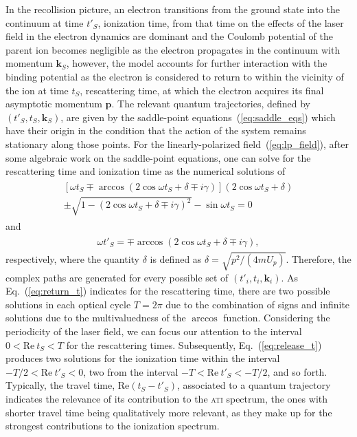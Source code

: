 In the recollision picture, an electron transitions from the ground
state into the continuum at time $t'_{S}$, ionization time, from that
time on the effects of the laser field in the electron dynamics are
dominant and the Coulomb potential of the parent ion becomes
negligible as the electron propagates in the continuum with momentum
$\mathbf{k}_{S}$, however, the model accounts for further interaction
with the binding potential as the electron is considered to return to
within the vicinity of the ion at time $t_{S}$, rescattering time, at
which the electron acquires its final asymptotic momentum
$\mathbf{p}$. The relevant quantum trajectories, defined by $(t'_{S},
t_{S}, \mathbf{k}_{S})$, are given by the saddle-point
equations~(\ref{eq:saddle_eqs}) which have their origin in the
condition that the action of the system remains stationary along those
points. For the linearly-polarized field~(\ref{eq:lp_field}), after
some algebraic work on the saddle-point equations, one can solve for
the rescattering time and ionization time as the numerical solutions
of~\cite{KopoldOptComm2000}
%
\begin{eqnarray}
  \label{eq:return_t}
  \begin{split}
    [\omega t_{S} \mp \arccos(2\cos\omega t_{S} + \delta \mp i\gamma)]
    (2\cos\omega t_{S} + \delta) \\
    \pm \sqrt{1 - (2\cos\omega t_{S} + \delta \mp i\gamma)^{2}} 
    - \sin\omega t_{S} = 0
  \end{split}
\end{eqnarray}
%
and
%
\begin{eqnarray}
  \label{eq:release_t}
  \begin{split}
    \omega t'_{S} = \mp \arccos(2\cos\omega t_{S} + \delta \mp i\gamma),
  \end{split}
\end{eqnarray}  
%
respectively, where the quantity $\delta$ is defined as $\delta =
\sqrt{p^{2} / (4mU_{p})}$. Therefore, the complex paths are generated
for every possible set of $(t'_{i}, t_{i}, \mathbf{k}_{i})$. As
Eq.~(\ref{eq:return_t}) indicates for the rescattering time, there are
two possible solutions in each optical cycle $T = 2\pi$ due to the
combination of signs and infinite solutions due to the multivaluedness
of the $\arccos$ function. Considering the periodicity of the laser
field, we can focus our attention to the interval $0 <
\mathrm{Re}\ t_{S} < T$ for the rescattering times. Subsequently,
Eq.~(\ref{eq:release_t}) produces two solutions for the ionization
time within the interval $-T/2 < \mathrm{Re}\ t'_{S} < 0$, two from
the interval $-T < \mathrm{Re}\ t'_{S} < -T/2$, and so
forth. Typically, the travel time, $\mathrm{Re}(t_{S} - t'_{S})$,
associated to a quantum trajectory indicates the relevance of its
contribution to the \textsc{ati} spectrum, the ones with shorter
travel time being qualitatively more relevant, as they make up for the
strongest contributions to the ionization spectrum.

